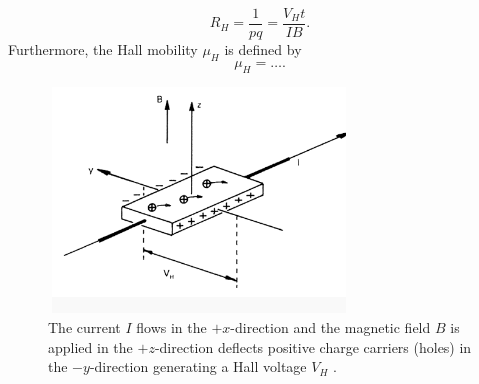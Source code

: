 \begin{equation}\label{eq:hall_coeff}
	R_H = \frac{1}{p q} = \frac{V_H t}{I B}.
\end{equation}
Furthermore, the Hall mobility $\mu_H$ is defined by 
\begin{equation}\label{eq:mu_hall}
	\mu_H = \ldots.
\end{equation}
\begin{figure}[ht]
	\centering
	\includegraphics[height=6cm,width=8cm]{figs/results/hall_diagram}
	\caption[Hall effect measurement diagram]{The current $I$ flows in the $+x$-direction and the magnetic field $B$ is applied in the $+z$-direction deflects positive charge carriers (holes) in the $-y$-direction generating a Hall voltage $V_H$ \cite{HallDiagram,HallEffectNIST}.}
	\label{fig:hall_diagram}
\end{figure}